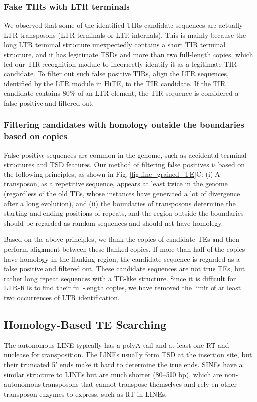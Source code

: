\documentclass{bmcart}
\begin{document}
\subsubsection*{Fake TIRs with LTR terminals}
We observed that some of the identified TIRs candidate sequences are actually LTR transposons (LTR terminals or LTR internals). This is mainly because the long LTR terminal structure unexpectedly contains a short TIR terminal structure, and it has legitimate TSDs and more than two full-length copies, which led our TIR recognition module to incorrectly identify it as a legitimate TIR candidate. To filter out such false positive TIRs, align the LTR sequences, identified by the LTR module in HiTE, to the TIR candidate. If the TIR candidate contains 80\% of an LTR element, the TIR sequence is considered a false positive and filtered out.

\subsubsection*{Filtering candidates with homology outside the boundaries based on copies}
False-positive sequences are common in the genome, such as accidental terminal structures and TSD features. Our method of filtering false positives is based on the following principles, as shown in Fig. \ref{fig:fine_grained_TE}C: (i) A transposon, as a repetitive sequence, appears at least twice in the genome (regardless of the old TEs, whose instances have generated a lot of divergence after a long evolution), and (ii) the boundaries of transposons determine the starting and ending positions of repeats, and the region outside the boundaries should be regarded as random sequences and should not have homology.

Based on the above principles, we flank the copies of candidate TEs and then perform alignment between these flanked copies. If more than half of the copies have homology in the flanking region, the candidate sequence is regarded as a false positive and filtered out. These candidate sequences are not true TEs, but rather long repeat sequences with a TE-like structure. Since it is difficult for LTR-RTs to find their full-length copies, we have removed the limit of at least two occurrences of LTR identification.

\subsection*{Homology-Based TE Searching}
The autonomous LINE typically has a polyA tail and at least one RT and nuclease for transposition. The LINEs usually form TSD at the insertion site, but their truncated 5' ends make it hard to determine the true ends. SINEs have a similar structure to LINEs but are much shorter (80–500 bp), which are non-autonomous transposons that cannot transpose themselves and rely on other transposon enzymes to express, such as RT in LINEs.
\end{document}
